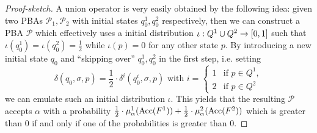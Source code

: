 \begin{proof}[Proof-sketch]
  A union operator is very easily obtained by the following idea: given two
  \acp{PBA} $\mathcal{P}_{1},\mathcal{P}_{2}$ with initial states $q^{1}_{0},
  q^{2}_{0}$ respectively, then we can construct a \ac{PBA} $\mathcal{P}$ which
  effectively uses a initial distribution 
  $\iota:Q^{1}\cup Q^{2}\rightarrow\left[0,1\right]$ such that 
  $\iota(q^{1}_{0}) = \iota(q^{2}_{0}) = \frac{1}{2}$ while $\iota(p) = 0$ for
  any other state $p$. By introducing a new initial state $q_{0}$ and 
  \enquote{skipping over} $q^{1}_{0},q^{2}_{0}$ in the first step, i.e.
  setting
  \begin{equation*}
    \delta(q_{0},\sigma, p) = \frac{1}{2}\cdot\delta^{i}(q^{i}_{0},\sigma, p)
    \text{ with }
    i = \begin{cases}
      1&\text{if }p\in Q^{1},\\
      2&\text{if }p\in Q^{2}
    \end{cases}
  \end{equation*}
  we can emulate such an initial distribution $\iota$. This yields that the 
  resulting $\mathcal{P}$ accepts $\alpha$ with a probability
  $\frac{1}{2}\cdot\mu^{1}_{\alpha}(\operatorname{Acc}(F^{1})) + 
  \frac{1}{2}\cdot\mu^{2}_{\alpha}(\operatorname{Acc}(F^{2}))$ which is greater than $0$ if
  and only if one of the probabilities is greater than $0$.


\end{proof}

